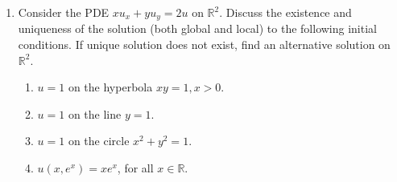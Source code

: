 \documentclass[11pt,a4paper]{article}
\begin{document}
\begin{enumerate}
\item Consider the PDE $x u_x+y u_y = 2u$ on $\mathbb{R}^2$. Discuss the existence and uniqueness of the solution (both global and local) to the following initial conditions. If unique solution does not exist, find an alternative solution on $\mathbb{R}^2$.
\begin{enumerate}
    \item $u = 1$ on the hyperbola $xy = 1, x > 0$.
    \item $u = 1$ on the line $y = 1$.
    \item $u = 1$ on the circle $x^2 + y^2 = 1$.
    \item $u(x, e^x) = x e^x$, for all $x \in \mathbb{R}$.
\end{enumerate}

\end{enumerate}
\end{document}
